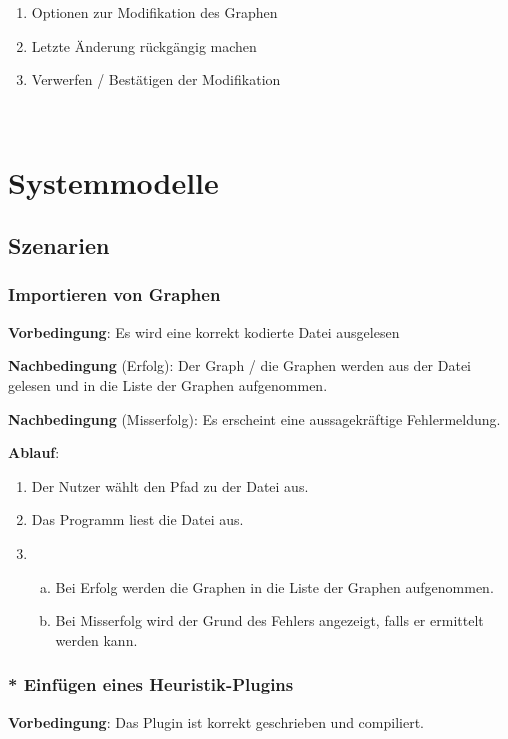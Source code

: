 \documentclass{article}
\begin{document}
	\FloatBarrier
	
	\begin{enumerate}[(1)]
		\item{Optionen zur Modifikation des Graphen}
		\item{Letzte Änderung rückgängig machen}
		\item{Verwerfen / Bestätigen der Modifikation}
	\end{enumerate}
	
	~\newpage
	\section{Systemmodelle}
	\subsection{Szenarien}
	
	\subsubsection{Importieren von Graphen}
	\textbf{Vorbedingung}: Es wird eine korrekt kodierte Datei ausgelesen
	
	\textbf{Nachbedingung} (Erfolg): Der Graph / die Graphen werden aus der Datei gelesen und in die Liste der Graphen aufgenommen.
	
	\textbf{Nachbedingung} (Misserfolg): Es erscheint eine aussagekräftige Fehlermeldung.
	
	\textbf{Ablauf}:
	\begin{enumerate}[1)]
		\item{Der Nutzer wählt den Pfad zu der Datei aus.}
		\item{Das Programm liest die Datei aus.}
		\item{
			\begin{enumerate}[a)]
				\item{Bei Erfolg werden die Graphen in die Liste der Graphen aufgenommen.}
				\item{Bei Misserfolg wird der Grund des Fehlers angezeigt, falls er ermittelt werden kann.}
			\end{enumerate}
		}
	\end{enumerate}
	
	
	\subsubsection{* Einfügen eines Heuristik-Plugins}
	\textbf{Vorbedingung}: Das Plugin ist korrekt geschrieben und compiliert.
	
\end{document}
